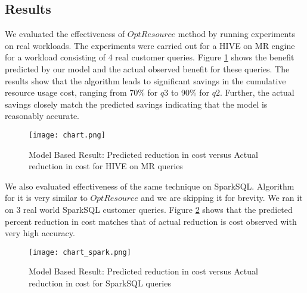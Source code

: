 \subsection{Results}
We evaluated the effectiveness of $OptResource$ method by running experiments on real workloads. The experiments were carried out for a HIVE on MR engine for a workload consisting of 4 real customer queries. 
Figure \ref{fig:modelbasedresult} shows the benefit predicted by our model and the actual observed benefit for these queries. The results show that the algorithm leads to significant savings in the cumulative resource usage cost, ranging from 70\% for $q3$ to 90\% for $q2$. Further, the actual savings closely match the predicted savings indicating that the model is reasonably accurate.

\begin{figure}[h]
	\texttt{[image: chart.png]}
	\caption{Model Based Result: Predicted reduction in cost versus Actual reduction in cost for HIVE on MR queries}
	\label{fig:modelbasedresult}
\end{figure}

We also evaluated effectiveness of the same technique on SparkSQL. Algorithm for it is very similar to $OptResource$ and we are skipping it for brevity. We ran it on 3 real world SparkSQL customer queries. Figure \ref{fig:modelbasedresultspark} shows that the predicted percent reduction in cost matches that of actual reduction is cost observed with very high accuracy.

\begin{figure}[h]
	\texttt{[image: chart\_spark.png]}
	\caption{Model Based Result: Predicted reduction in cost versus Actual reduction in cost for SparkSQL queries}
	\label{fig:modelbasedresultspark}
\end{figure}